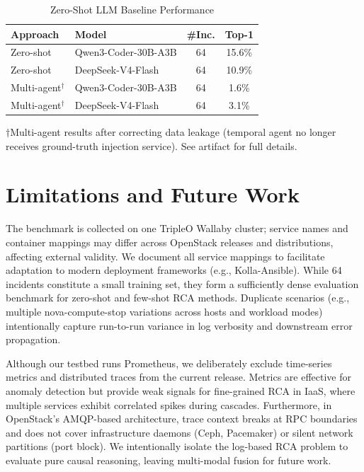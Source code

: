 \documentclass[sigconf,review]{acmart}
\begin{document}
\begin{table}[t]
\centering
\footnotesize
\caption{Zero-Shot LLM Baseline Performance}
\label{tab:llm}
\begin{tabular}{@{}lp{2.5cm}cc@{}}
\toprule
\textbf{Approach} & \textbf{Model} & \textbf{\#Inc.} & \textbf{Top-1} \\
\midrule
Zero-shot & Qwen3-Coder-30B-A3B & 64 & 15.6\% \\
Zero-shot & DeepSeek-V4-Flash & 64 & 10.9\% \\
Multi-agent$^\dagger$ & Qwen3-Coder-30B-A3B & 64 & 1.6\% \\
Multi-agent$^\dagger$ & DeepSeek-V4-Flash & 64 & 3.1\% \\
\bottomrule
\end{tabular}
\end{table}
$\dagger$Multi-agent results after correcting data leakage (temporal agent no longer receives ground-truth injection service). See artifact for full details.




\section{Limitations and Future Work}
\label{sec:limitations}

The benchmark is collected on one TripleO Wallaby cluster; service names and container mappings may differ across OpenStack releases and distributions, affecting external validity. We document all service mappings to facilitate adaptation to modern deployment frameworks (e.g., Kolla-Ansible). While 64 incidents constitute a small training set, they form a sufficiently dense evaluation benchmark for zero-shot and few-shot RCA methods. Duplicate scenarios (e.g., multiple nova-compute-stop variations across hosts and workload modes) intentionally capture run-to-run variance in log verbosity and downstream error propagation.

Although our testbed runs Prometheus, we deliberately exclude time-series metrics and distributed traces from the current release. Metrics are effective for anomaly detection but provide weak signals for fine-grained RCA in IaaS, where multiple services exhibit correlated spikes during cascades. Furthermore, in OpenStack's AMQP-based architecture, trace context breaks at RPC boundaries and does not cover infrastructure daemons (Ceph, Pacemaker) or silent network partitions (port block). We intentionally isolate the log-based RCA problem to evaluate pure causal reasoning, leaving multi-modal fusion for future work.
\end{document}
